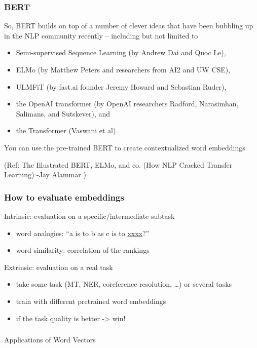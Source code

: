 \begin{frame}[fragile]\frametitle{BERT}
So, BERT builds on top of a number of clever ideas that have been bubbling up in the NLP community recently – 
including but not limited to 
\begin{itemize}
\item  Semi-supervised Sequence Learning (by Andrew Dai and Quoc Le), 
\item  ELMo (by Matthew Peters and researchers from AI2 and UW CSE), 
\item  ULMFiT (by fast.ai founder Jeremy Howard and Sebastian Ruder), 
\item  the OpenAI transformer (by OpenAI researchers Radford, Narasimhan, Salimans, and Sutskever), and 
\item  the Transformer (Vaswani et al).
\end{itemize}

You can use the pre-trained BERT to create contextualized word embeddings

{\tiny (Ref: The Illustrated BERT, ELMo, and co. (How NLP Cracked Transfer Learning) -Jay Alammar )}
\end{frame}



\begin{frame}[fragile]\frametitle{How to evaluate embeddings}
Intrinsic: evaluation on a specific/intermediate subtask
\begin{itemize}
\item  word analogies: “a is to b as c is to \underline{xxxx}?” 
\item  word similarity: correlation of the rankings
\end{itemize}
Extrinsic: evaluation on a real task
\begin{itemize}
\item  take some task (MT, NER, coreference resolution, …) or several tasks
\item   train with different pretrained word embeddings
\item  if the task quality is better -> win!
\end{itemize}
\end{frame}


\begin{frame}[fragile]\frametitle{}

\begin{center}
{\Large Applications of Word Vectors}
\end{center}
\end{frame}




